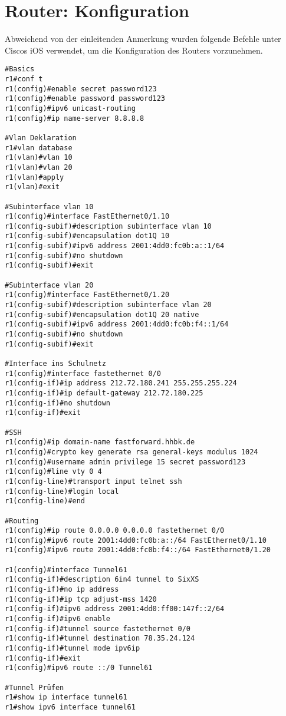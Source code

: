 \section{Router: Konfiguration}

Abweichend von der einleitenden Anmerkung wurden folgende Befehle unter Ciscos iOS verwendet, um die Konfiguration des Routers vorzunehmen.

\begin{lstlisting}[numbers=none]
#Basics
r1#conf t
r1(config)#enable secret password123
r1(config)#enable password password123
r1(config)#ipv6 unicast-routing
r1(config)#ip name-server 8.8.8.8

#Vlan Deklaration
r1#vlan database 
r1(vlan)#vlan 10
r1(vlan)#vlan 20
r1(vlan)#apply
r1(vlan)#exit

#Subinterface vlan 10
r1(config)#interface FastEthernet0/1.10
r1(config-subif)#description subinterface vlan 10
r1(config-subif)#encapsulation dot1Q 10
r1(config-subif)#ipv6 address 2001:4dd0:fc0b:a::1/64
r1(config-subif)#no shutdown
r1(config-subif)#exit

#Subinterface vlan 20
r1(config)#interface FastEthernet0/1.20
r1(config-subif)#description subinterface vlan 20
r1(config-subif)#encapsulation dot1Q 20 native
r1(config-subif)#ipv6 address 2001:4dd0:fc0b:f4::1/64
r1(config-subif)#no shutdown
r1(config-subif)#exit

#Interface ins Schulnetz
r1(config)#interface fastethernet 0/0
r1(config-if)#ip address 212.72.180.241 255.255.255.224
r1(config-if)#ip default-gateway 212.72.180.225
r1(config-if)#no shutdown
r1(config-if)#exit

#SSH
r1(config)#ip domain-name fastforward.hhbk.de
r1(config)#crypto key generate rsa general-keys modulus 1024
r1(config)#username admin privilege 15 secret password123
r1(config)#line vty 0 4
r1(config-line)#transport input telnet ssh
r1(config-line)#login local
r1(config-line)#end

#Routing
r1(config)#ip route 0.0.0.0 0.0.0.0 fastethernet 0/0
r1(config)#ipv6 route 2001:4dd0:fc0b:a::/64 FastEthernet0/1.10
r1(config)#ipv6 route 2001:4dd0:fc0b:f4::/64 FastEthernet0/1.20

r1(config)#interface Tunnel61
r1(config-if)#description 6in4 tunnel to SixXS
r1(config-if)#no ip address
r1(config-if)#ip tcp adjust-mss 1420
r1(config-if)#ipv6 address 2001:4dd0:ff00:147f::2/64
r1(config-if)#ipv6 enable
r1(config-if)#tunnel source fastethernet 0/0
r1(config-if)#tunnel destination 78.35.24.124
r1(config-if)#tunnel mode ipv6ip
r1(config-if)#exit
r1(config)#ipv6 route ::/0 Tunnel61

#Tunnel Prüfen
r1#show ip interface tunnel61
r1#show ipv6 interface tunnel61
\end{lstlisting}

